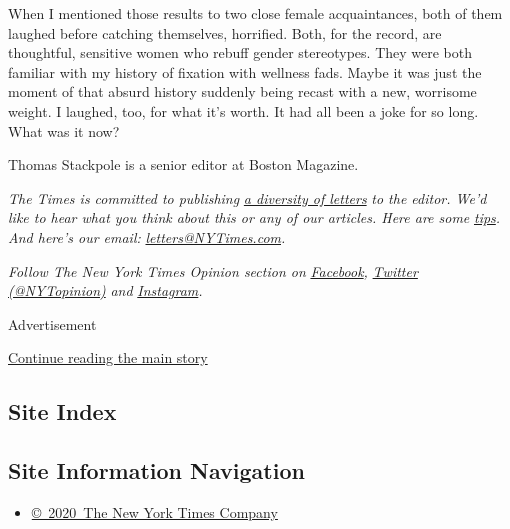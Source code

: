 When I mentioned those results to two close female acquaintances, both
of them laughed before catching themselves, horrified. Both, for the
record, are thoughtful, sensitive women who rebuff gender stereotypes.
They were both familiar with my history of fixation with wellness fads.
Maybe it was just the moment of that absurd history suddenly being
recast with a new, worrisome weight. I laughed, too, for what it's
worth. It had all been a joke for so long. What was it now?

Thomas Stackpole is a senior editor at Boston Magazine.

\emph{The Times is committed to publishing}
\href{https://www.nytimes3xbfgragh.onion/2019/01/31/opinion/letters/letters-to-editor-new-york-times-women.html}{\emph{a
diversity of letters}} \emph{to the editor. We'd like to hear what you
think about this or any of our articles. Here are some}
\href{https://help.nytimes3xbfgragh.onion/hc/en-us/articles/115014925288-How-to-submit-a-letter-to-the-editor}{\emph{tips}}\emph{.
And here's our email:}
\href{mailto:letters@NYTimes.com}{\emph{letters@NYTimes.com}}\emph{.}

\emph{Follow The New York Times Opinion section on}
\href{https://www.facebookcorewwwi.onion/nytopinion}{\emph{Facebook}}\emph{,}
\href{http://twitter.com/NYTOpinion}{\emph{Twitter (@NYTopinion)}}
\emph{and}
\href{https://www.instagram.com/nytopinion/}{\emph{Instagram}}\emph{.}

Advertisement

\protect\hyperlink{after-bottom}{Continue reading the main story}

\hypertarget{site-index}{%
\subsection{Site Index}\label{site-index}}

\hypertarget{site-information-navigation}{%
\subsection{Site Information
Navigation}\label{site-information-navigation}}

\begin{itemize}
\tightlist
\item
  \href{https://help.nytimes3xbfgragh.onion/hc/en-us/articles/115014792127-Copyright-notice}{©~2020~The
  New York Times Company}
\end{itemize}

